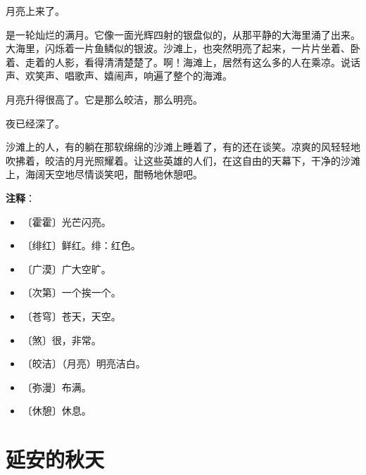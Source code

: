 \documentclass[12pt,UTF-8,openany]{ctexbook}
\begin{document}
\begin{large}
    月亮上来了。
    
    是一轮灿烂的满月。它像一面光辉四射的银盘似的，从那平静的大海里涌了出来。大海里，闪烁着一片鱼鳞似的银波。沙滩上，也突然明亮了起来，一片片坐着、卧着、走着的人影，看得清清楚楚了。啊！海滩上，居然有这么多的人在乘凉。说话声、欢笑声、唱歌声、嬉闹声，响遍了整个的海滩。
    
    月亮升得很高了。它是那么皎洁，那么明亮。
    
    夜已经深了。
    
    沙滩上的人，有的躺在那软绵绵的沙滩上睡着了，有的还在谈笑。凉爽的风轻轻地吹拂着，皎洁的月光照耀着。让这些英雄的人们，在这自由的天幕下，干净的沙滩上，海阔天空地尽情谈笑吧，酣畅地休憩吧。
    
\end{large}


\newpage

\textbf{注释}：

\vspace{-1em}

\begin{itemize}
    \setlength\itemsep{-0.2em}
    \item 〔霍霍〕光芒闪亮。
    \item 〔绯红〕鲜红。绯：红色。
    \item 〔广漠〕广大空旷。
    \item 〔次第〕一个挨一个。
    \item 〔苍穹〕苍天，天空。
    \item 〔煞〕很，非常。
    \item 〔皎洁〕（月亮）明亮洁白。
    \item 〔弥漫〕布满。
    \item 〔休憩〕休息。
\end{itemize}

\chapter{延安的秋天}
\end{document}
